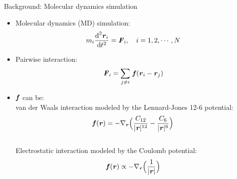 \documentclass{beamer}
\newcommand{\redc}[1]{{\color{red} #1}}
\newcommand{\bluec}[1]{{\color{blue} #1}}
\newcommand{\vect}[1]{\textbf{\textit{#1}}}
\renewcommand{\d}[1]{\textrm{#1}}
\begin{document}
\begin{frame}{Background: Molecular dynamics simulation}
  \begin{itemize}\itemsep -10pt
  \item<1-> Molecular dynamics (MD) simulation:
    \bluec{
      \begin{align*}
        m_i \frac{\d d^2\vect r_i}{\d dt^2} = \vect F_i, \quad i = 1, 2, \cdots, N
      \end{align*}
    }
  \item<2-> Pairwise interaction:
    \bluec{
      \begin{align*}
        \vect F_i = \sum_{j\neq i}\, \vect f(\vect r_i - \vect r_j)
      \end{align*}}
  \item<3-> \bluec{$\vect f$} can be:\\
    van der Waals interaction modeled by the Lennard-Jones 12-6 potential:
    \bluec{
      \begin{align*}
        \vect f(\vect r) = -\nabla_{\vect r}
        \Big(
        \frac{C_{12}}{\vert\vect r\vert^{12}}
        -\frac{C_{6}}{\vert\vect r\vert^{6}}
        \Big)
      \end{align*}
    }\\
    Electrostatic interaction modeled by the Coulomb potential:
    \bluec{
      \begin{align*}
        \vect f(\vect r) \propto -\nabla_{\vect r}
        \Big(
        \frac{1}{\vert \vect r\vert}
        \Big)
      \end{align*}}
  \end{itemize}
\end{frame}

\end{document}

